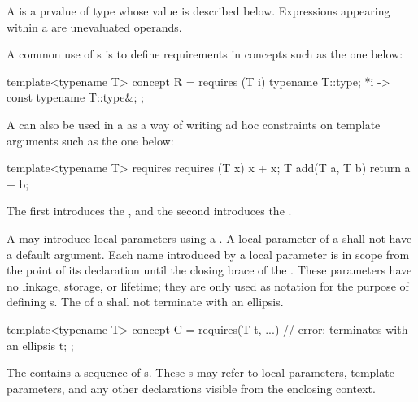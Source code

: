 \pnum
A  is a prvalue of type 
whose value is described below.
Expressions appearing within a 
are unevaluated operands.

\pnum
\begin{example}
A common use of s is to define
requirements in concepts such as the one below:
\begin{codeblock}
template<typename T>
  concept R = requires (T i) {
    typename T::type;
    {*i} -> const typename T::type&;
  };
\end{codeblock}
A  can also be used in a
 as a way of writing ad hoc
constraints on template arguments such as the one below:
\begin{codeblock}
template<typename T>
  requires requires (T x) { x + x; }
    T add(T a, T b) { return a + b; }
\end{codeblock}
The first  introduces the
, and the second
introduces the .
\end{example}

\pnum
A  may introduce local parameters using a
.
A local parameter of a  shall not have a
default argument.
Each name introduced by a local parameter is in scope from the point
of its declaration until the closing brace of the
.
These parameters have no linkage, storage, or lifetime; they are only used
as notation for the purpose of defining s.
The  of a
shall not terminate with an ellipsis.
\begin{example}
\begin{codeblock}
template<typename T>
concept C = requires(T t, ...) {    // error: terminates with an ellipsis
  t;
};
\end{codeblock}
\end{example}

\pnum
{}%
The  contains
a sequence of s.
These s may refer to local
parameters, template parameters, and any other declarations visible from the
enclosing context.

